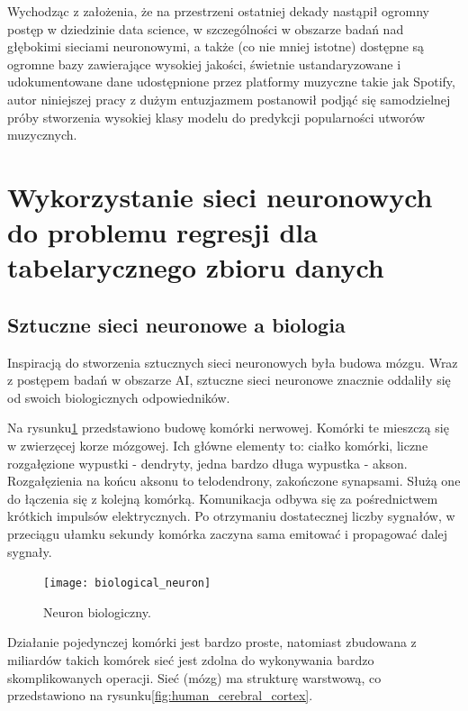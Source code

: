 \documentclass[a4paper,11pt]{article}
\begin{document}
    \bigskip

    Wychodząc z założenia, że na przestrzeni ostatniej dekady nastąpił ogromny postęp w dziedzinie data science, w szczególności w obszarze badań nad głębokimi sieciami neuronowymi, a także (co nie mniej istotne) dostępne są ogromne bazy zawierające wysokiej jakości, świetnie ustandaryzowane i udokumentowane dane udostępnione przez platformy muzyczne takie jak Spotify, autor niniejszej pracy z dużym entuzjazmem postanowił podjąć się samodzielnej próby stworzenia wysokiej klasy modelu do predykcji popularności utworów muzycznych.


    \section{Wykorzystanie sieci neuronowych do problemu regresji dla tabelarycznego zbioru danych}

    \subsection{Sztuczne sieci neuronowe a biologia}

    Inspiracją do stworzenia sztucznych sieci neuronowych była budowa mózgu. Wraz z postępem badań w obszarze AI, sztuczne sieci neuronowe znacznie oddaliły się od swoich biologicznych odpowiedników\cite{UczenieMaszynowe2018}.

    \bigskip

    Na rysunku\ref{fig:biological_neuron} przedstawiono budowę komórki nerwowej. Komórki te mieszczą się w zwierzęcej korze mózgowej. Ich główne elementy to: ciałko komórki, liczne rozgałęzione wypustki - dendryty, jedna bardzo długa wypustka - akson. Rozgałęzienia na końcu aksonu to telodendrony, zakończone synapsami. Służą one do łączenia się z kolejną komórką. Komunikacja odbywa się za pośrednictwem krótkich impulsów elektrycznych. Po otrzymaniu dostatecznej liczby sygnałów, w przeciągu ułamku sekundy komórka zaczyna sama emitować i propagować dalej sygnały\cite{UczenieMaszynowe2018}.

    \bigskip

    \begin{figure}[H]
        \label{fig:biological_neuron}
        \centering
        \texttt{[image: biological\_neuron]}
        \caption{Neuron biologiczny\cite{UczenieMaszynowe2018}.}
    \end{figure}

    \bigskip

    Działanie pojedynczej komórki jest bardzo proste, natomiast zbudowana z miliardów takich komórek sieć jest zdolna do wykonywania bardzo skomplikowanych operacji. Sieć (mózg) ma strukturę warstwową, co przedstawiono na rysunku\ref{fig:human_cerebral_cortex}\cite{UczenieMaszynowe2018}.
\end{document}

